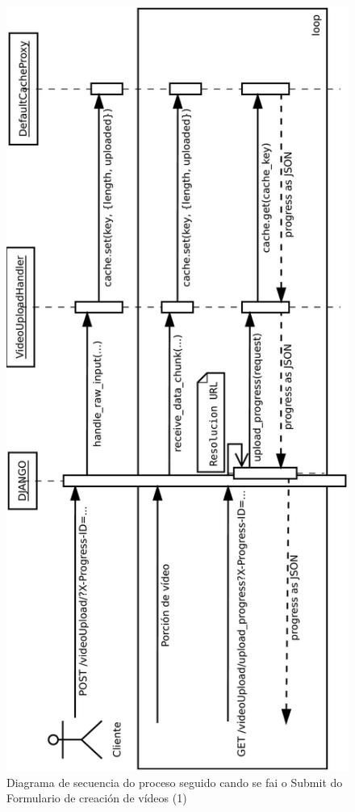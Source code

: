         \begin{figure}[htp]
        \begin{center}
            \includegraphics[scale=0.45]{figures/SubidaVideo.pdf}
            \caption{Diagrama de secuencia do proceso seguido cando se fai o Submit do Formulario 
            de creación de vídeos (1)}
        \label{fig:SubidaVideo1}
        \end{center}
        \end{figure}
        
